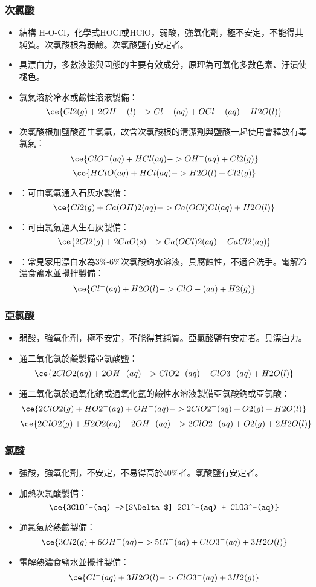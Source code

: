\documentclass[a4paper,12pt]{report}
\begin{document}
\subsubsection{次氯酸}
\begin{itemize}
\item 結構 H-O-Cl，化學式HOCl或HClO，弱酸，強氧化劑，極不安定，不能得其純質。次氯酸根為弱鹼。次氯酸鹽有安定者。
\item 具漂白力，多數液態與固態的主要有效成分，原理為可氧化多數色素、汙漬使褪色。
\item 氯氣溶於冷水或鹼性溶液製備：
\[\ce{Cl2(g) + 2OH-(l) -> Cl-(aq) + OCl-(aq) + H2O(l)}\]
\item 次氯酸根加鹽酸產生氯氣，故含次氯酸根的清潔劑與鹽酸一起使用會釋放有毒氯氣：
\[\ce{ClO^-(aq) + HCl(aq) -> OH^-(aq) + Cl2(g)}\]
\[\ce{HClO(aq) + HCl(aq) -> H2O(l) + Cl2(g)}\]
\item {}：可由氯氣通入石灰水製備：
\[\ce{Cl2(g) + Ca(OH)2(aq) -> Ca(OCl)Cl(aq) + H2O(l)}\]
\item {}：可由氯氣通入生石灰製備：
\[\ce{2Cl2(g) + 2CaO(s) -> Ca(OCl)2(aq) + CaCl2(aq)}\]
\item {}：常見家用漂白水為3\%-6\%次氯酸鈉水溶液，具腐蝕性，不適合洗手。電解冷濃食鹽水並攪拌製備：
\[\ce{Cl^-(aq) + H2O(l) -> ClO-(aq) + H2(g)}\]
\end{itemize}
\subsubsection{亞氯酸}
\begin{itemize}
\item 弱酸，強氧化劑，極不安定，不能得其純質。亞氯酸鹽有安定者。具漂白力。
\item 通二氧化氯於鹼製備亞氯酸鹽：
\[\ce{2ClO2(aq) + 2OH^-(aq) -> ClO2^-(aq) + ClO3^-(aq) + H2O(l)}\]
\item 通二氧化氯於過氧化鈉或過氧化氫的鹼性水溶液製備亞氯酸鈉或亞氯酸：
\[\ce{2ClO2(g) + HO2^-(aq) + OH^-(aq) -> 2ClO2^-(aq) + O2(g) + H2O(l)}\]
\[\ce{2ClO2(g) + H2O2(aq) + 2OH^-(aq) -> 2ClO2^-(aq) + O2(g) + 2H2O(l)}\]
\end{itemize}
\subsubsection{氯酸}
\begin{itemize}
\item 強酸，強氧化劑，不安定，不易得高於40\%者。氯酸鹽有安定者。
\item 加熱次氯酸製備：
\[\ce{3ClO^-(aq) ->[$\Delta$] 2Cl^-(aq) + ClO3^-(aq)}\]
\item 通氯氣於熱鹼製備：
\[\ce{3Cl2(g) + 6OH^-(aq) -> 5Cl^-(aq) + ClO3^-(aq) + 3H2O(l)}\]
\item 電解熱濃食鹽水並攪拌製備：
\[\ce{Cl^-(aq) + 3H2O(l) -> ClO3^-(aq) + 3H2(g)}\]
\end{itemize}
\end{document}
